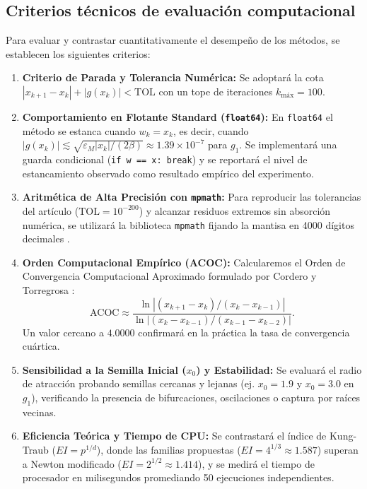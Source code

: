 \documentclass[10pt, a4paper]{article}
\begin{document}
\subsection{Criterios técnicos de evaluación computacional}
Para evaluar y contrastar cuantitativamente el desempeño de los métodos, se establecen los siguientes criterios:
\begin{enumerate}
    \item \textbf{Criterio de Parada y Tolerancia Numérica:} Se adoptará la cota $|x_{k+1} - x_k| + |g(x_k)| < \text{TOL}$ con un tope de iteraciones $k_{\text{máx}} = 100$.
    \item \textbf{Comportamiento en Flotante Standard (\texttt{float64}):} En \texttt{float64} el método se estanca cuando $w_k = x_k$, es decir, cuando $|g(x_k)| \lesssim \sqrt{\varepsilon_M |x_k| / (2\beta)} \approx 1.39 \times 10^{-7}$ para $g_1$. Se implementará una guarda condicional (\texttt{if w == x: break}) y se reportará el nivel de estancamiento observado como resultado empírico del experimento.
    \item \textbf{Aritmética de Alta Precisión con \texttt{mpmath}:} Para reproducir las tolerancias del artículo ($\text{TOL} = 10^{-200}$) y alcanzar residuos extremos sin absorción numérica, se utilizará la biblioteca \texttt{mpmath} fijando la mantisa en 4000 dígitos decimales \cite{mpmath2024}.
    \item \textbf{Orden Computacional Empírico (ACOC):} Calcularemos el Orden de Convergencia Computacional Aproximado formulado por Cordero y Torregrosa \cite{Cordero2007}:
    \begin{equation}
        \text{ACOC} \approx \frac{\ln |(x_{k+1} - x_k) / (x_k - x_{k-1})|}{\ln |(x_k - x_{k-1}) / (x_{k-1} - x_{k-2})|}. \label{eq:acoc}
    \end{equation}
    Un valor cercano a $4.0000$ confirmará en la práctica la tasa de convergencia cuártica.
    \item \textbf{Sensibilidad a la Semilla Inicial ($x_0$) y Estabilidad:} Se evaluará el radio de atracción probando semillas cercanas y lejanas (ej. $x_0 = 1.9$ y $x_0 = 3.0$ en $g_1$), verificando la presencia de bifurcaciones, oscilaciones o captura por raíces vecinas.
    \item \textbf{Eficiencia Teórica y Tiempo de CPU:} Se contrastará el índice de Kung-Traub ($EI = p^{1/d}$), donde las familias propuestas ($EI = 4^{1/3} \approx 1.587$) superan a Newton modificado ($EI = 2^{1/2} \approx 1.414$), y se medirá el tiempo de procesador en milisegundos promediando 50 ejecuciones independientes.
\end{enumerate}
\end{document}
